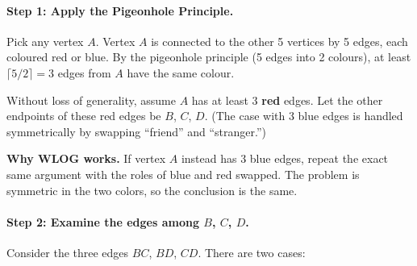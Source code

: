 \documentclass[12pt, a4paper]{article}
\begin{document}
\paragraph{Step 1: Apply the Pigeonhole Principle.}
Pick any vertex $A$. Vertex $A$ is connected to the other 5 vertices
by 5 edges, each coloured red or blue.
By the pigeonhole principle (5 edges into 2 colours),
at least $\lceil 5/2 \rceil = 3$ edges from $A$ have the same colour.

Without loss of generality, assume $A$ has at least 3 \textbf{red}
edges. Let the other endpoints of these red edges be $B$, $C$, $D$.
(The case with 3 blue edges is handled symmetrically by swapping
``friend'' and ``stranger.'')

\textbf{Why WLOG works.}\; If vertex $A$ instead has 3 blue edges, repeat the exact same argument with the roles of blue and red swapped. The problem is symmetric in the two colors, so the conclusion is the same.

\begin{center}
\end{center}

\paragraph{Step 2: Examine the edges among $B$, $C$, $D$.}
Consider the three edges $BC$, $BD$, $CD$.
There are two cases:
\end{document}

